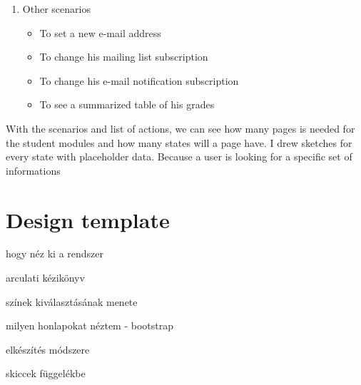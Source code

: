 \begin{enumerate}
	\item Other scenarios
	\begin{itemize}
		\item To set a new e-mail address
		\item To change his mailing list subscription
		\item To change his e-mail notification subscription
		\item To see a summarized table of his grades
	\end{itemize}
	
\end{enumerate}

With the scenarios and list of actions, we can see how many pages is needed for the student modules and how many states will a page have. I drew sketches for every state with placeholder data. Because a user is looking for a specific set of informations


\section{Design template}

hogy néz ki a rendszer

arculati kézikönyv

színek kiválasztásának menete

milyen honlapokat néztem - bootstrap

elkészítés módszere

skiccek függelékbe